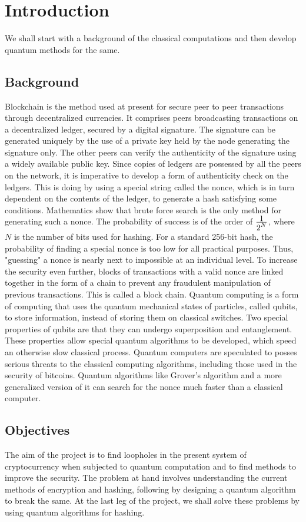 \section{Introduction}
We shall start with a background of the classical computations and then develop quantum methods for the same.
\subsection{Background}
Blockchain is the method used at present for secure peer to peer transactions through decentralized currencies\cite{btc}. It comprises peers broadcasting transactions on a decentralized ledger, secured by a digital signature. The signature can be generated uniquely by the use of a private key held by the node generating the signature only. The other peers can verify the authenticity of the signature using a widely available public key. Since copies of ledgers are possessed by all the peers on the network, it is imperative to develop a form of authenticity check on the ledgers. This is doing by using a special string called the nonce, which is in turn dependent on the contents of the ledger, to generate a hash satisfying some conditions. Mathematics show that brute force search is the only method for generating such a nonce. The probability of success is of the order of $\frac{\displaystyle 1}{\displaystyle 2^N}$, where $N$ is the number of bits used for hashing. For a standard 256-bit hash, the probability of finding a special nonce is too low for all practical purposes. Thus, "guessing" a nonce is nearly next to impossible at an individual level. To increase the security even further, blocks of transactions with a valid nonce are linked together in the form of a chain to prevent any fraudulent manipulation of previous transactions. This is called a block chain.
Quantum computing is a form of computing that uses the quantum mechanical states of particles, called qubits, to store information, instead of storing them on classical switches. Two special properties of qubits are that they can undergo superposition and entanglement. These properties allow special quantum algorithms to be developed, which speed an otherwise slow classical process. Quantum computers are speculated to posses serious threats to the classical computing algorithms\cite{enc_br}, including those used in the security of bitcoins. Quantum algorithms like Grover's algorithm and a more generalized version of it can search for the nonce much faster than a classical computer.
\subsection{Objectives}
The aim of the project is to find loopholes in the present system of cryptocurrency\cite{btc} when subjected to quantum computation and to find methods to improve the security. The problem at hand involves understanding the current methods of encryption and hashing, following by designing a quantum algorithm to break the same. At the last leg of the project, we shall solve these problems by using quantum algorithms for hashing.

